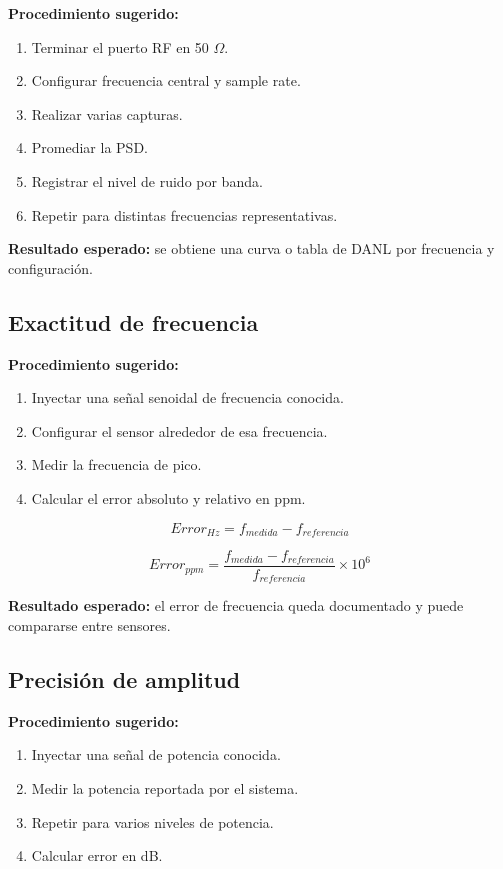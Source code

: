 \textbf{Procedimiento sugerido:}

\begin{enumerate}
    \item Terminar el puerto RF en 50 $\Omega$.
    \item Configurar frecuencia central y sample rate.
    \item Realizar varias capturas.
    \item Promediar la PSD.
    \item Registrar el nivel de ruido por banda.
    \item Repetir para distintas frecuencias representativas.
\end{enumerate}

\textbf{Resultado esperado:} se obtiene una curva o tabla de DANL por frecuencia y configuración.

\subsection{Exactitud de frecuencia}

\textbf{Procedimiento sugerido:}

\begin{enumerate}
    \item Inyectar una señal senoidal de frecuencia conocida.
    \item Configurar el sensor alrededor de esa frecuencia.
    \item Medir la frecuencia de pico.
    \item Calcular el error absoluto y relativo en ppm.
\end{enumerate}

\[
Error_{Hz} = f_{medida} - f_{referencia}
\]

\[
Error_{ppm} = \frac{f_{medida} - f_{referencia}}{f_{referencia}} \times 10^6
\]

\textbf{Resultado esperado:} el error de frecuencia queda documentado y puede compararse entre sensores.

\subsection{Precisión de amplitud}

\textbf{Procedimiento sugerido:}

\begin{enumerate}
    \item Inyectar una señal de potencia conocida.
    \item Medir la potencia reportada por el sistema.
    \item Repetir para varios niveles de potencia.
    \item Calcular error en dB.
\end{enumerate}

